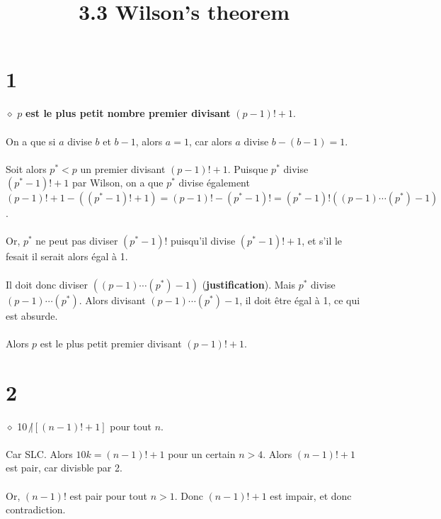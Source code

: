 \documentclass[a4paper,10pt]{article}
\title{3.3 Wilson's theorem}
\begin{document}
\maketitle

\section*{1}
$\diamond$ $p$ \textbf{est le plus petit nombre premier divisant} $(p-1)! + 1$. 
\\
\\
On a que si $a$ divise $b$ et $b-1$, alors $a = 1$, car alors $a$ divise $b - (b-1) = 1$.
\\
\\
Soit alors $p^* < p$ un premier divisant $(p-1)! + 1$. Puisque $p^*$ divise $(p^* - 1)! + 1$ par Wilson, on 
a que $p^*$ divise également $(p-1)! + 1 - ((p^* - 1)! + 1) = (p-1)! - (p^* - 1)! = (p^* - 1)!((p-1) \cdots (p^*) - 1)$.
\\
\\
Or, $p^*$ ne peut pas diviser $(p^* - 1)!$ puisqu'il divise $(p^* - 1)! + 1$, et s'il le fesait il serait alors égal à 1.
\\
\\
Il doit donc diviser $((p-1) \cdots (p^*) - 1)$ (\textbf{justification}). Mais $p^*$ divise $(p-1) \cdots (p^*)$. Alors divisant
$(p-1) \cdots (p^*) -1$, il doit être égal à 1, ce qui est absurde.
\\
\\
Alors $p$ est le plus petit premier divisant $(p-1)! + 1$.

\section*{2}
$\diamond$ 10 $\not | [(n-1)! + 1]$ pour tout $n$.
\\
\\
Car SLC. Alors $10k = (n-1)! + 1$ pour un certain $n > 4$. Alors $(n-1)! + 1$ est pair, car divisble par 2.
\\
\\
Or, $(n-1)!$ est pair pour tout $n > 1$. Donc $(n-1)! + 1$ est impair, et donc contradiction. 
\end{document}
